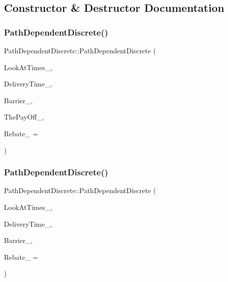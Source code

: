 \subsection{Constructor \& Destructor Documentation}
\hypertarget{classPathDependentDiscrete_a03466dd6f04f91e19bfd48aaca428245}{}\label{classPathDependentDiscrete_a03466dd6f04f91e19bfd48aaca428245} 
\subsubsection{\texorpdfstring{Path\+Dependent\+Discrete()}{PathDependentDiscrete()}\hspace{0.1cm}{\footnotesize\ttfamily [1/2]}}
{\footnotesize\ttfamily Path\+Dependent\+Discrete\+::\+Path\+Dependent\+Discrete (\begin{DoxyParamCaption}\item[{const \hyperlink{classMJArray}{M\+J\+Array} \&}]{Look\+At\+Times\+\_\+,  }\item[{double}]{Delivery\+Time\+\_\+,  }\item[{double}]{Barrier\+\_\+,  }\item[{const \hyperlink{classPayOffBridge}{Pay\+Off\+Bridge} \&}]{The\+Pay\+Off\+\_\+,  }\item[{double}]{Rebate\+\_\+ = {} }\end{DoxyParamCaption})}

\hypertarget{classPathDependentDiscrete_a4744ebcda027631181ce48d63c1e15e8}{}\label{classPathDependentDiscrete_a4744ebcda027631181ce48d63c1e15e8} 
\subsubsection{\texorpdfstring{Path\+Dependent\+Discrete()}{PathDependentDiscrete()}\hspace{0.1cm}{\footnotesize\ttfamily [2/2]}}
{\footnotesize\ttfamily Path\+Dependent\+Discrete\+::\+Path\+Dependent\+Discrete (\begin{DoxyParamCaption}\item[{const \hyperlink{classMJArray}{M\+J\+Array} \&}]{Look\+At\+Times\+\_\+,  }\item[{double}]{Delivery\+Time\+\_\+,  }\item[{double}]{Barrier\+\_\+,  }\item[{double}]{Rebate\+\_\+ = {} }\end{DoxyParamCaption})}

